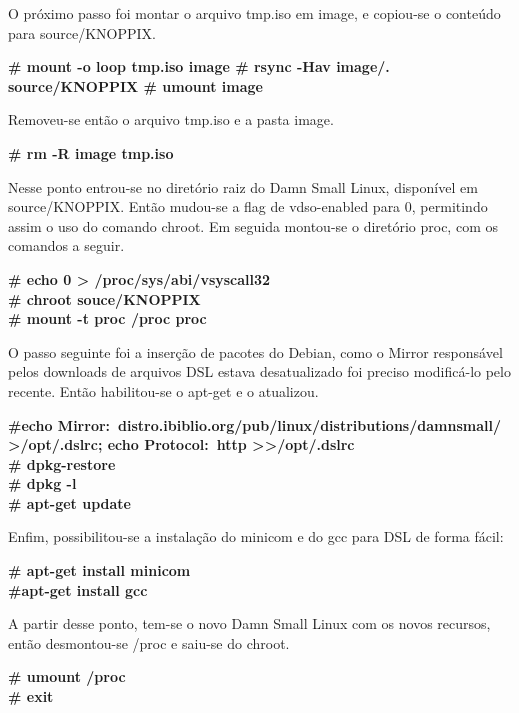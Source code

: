 \documentclass{ieee}
\begin{document}
O próximo passo foi montar o arquivo tmp.iso em image, e copiou-se o conteúdo para source/KNOPPIX.

\begin{flushleft}
 \textbf{\# mount -o loop tmp.iso image
\# rsync -Hav image/. source/KNOPPIX
\# umount image 
}
\end{flushleft}

Removeu-se então o arquivo tmp.iso e a pasta image.
\begin{flushleft}
 \textbf{\# rm -R image tmp.iso}
\end{flushleft}

Nesse ponto entrou-se no diretório raiz do Damn Small Linux, disponível em source/KNOPPIX. 
Então mudou-se a flag de vdso-enabled para 0, permitindo assim o uso do comando chroot. Em seguida montou-se o diretório proc, com os 
comandos a seguir.
\begin{flushleft}
 \textbf{\# echo 0 > /proc/sys/abi/vsyscall32\\
\# chroot souce/KNOPPIX\\
\# mount -t proc /proc proc \\
}
\end{flushleft}

O passo seguinte foi a inserção de pacotes do Debian, como o Mirror responsável pelos downloads
 de arquivos DSL estava desatualizado foi preciso modificá-lo pelo recente. Então habilitou-se o apt-get e o atualizou.
\begin{flushleft}
 \textbf{\#echo Mirror:\ distro.ibiblio.org/pub/linux/distributions/damnsmall/ >/opt/.dslrc; echo Protocol:\ http >>/opt/.dslrc\\
\# dpkg-restore\\
\# dpkg -l\\
\# apt-get update\\
}
\end{flushleft}

 Enfim, possibilitou-se a instalação do minicom e do gcc para DSL de forma fácil:
\begin{flushleft}
 \textbf{\# apt-get install minicom\\
\#apt-get install gcc\\
}
\end{flushleft}

A partir desse ponto, tem-se o novo Damn Small Linux com os novos recursos, então desmontou-se /proc e saiu-se do chroot.
\begin{flushleft}
 \textbf{\# umount /proc\\
\# exit\\
}
\end{flushleft}
\end{document}
